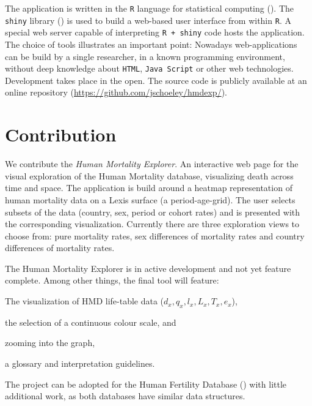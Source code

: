\documentclass[
  12pt
]{scrartcl}
\begin{document}
The application is written in the \texttt{R} language for statistical computing (\cite{RCT2014}). The \texttt{shiny} library (\cite{Chang2015}) is used to build a web-based user interface from within \texttt{R}. A special web server capable of interpreting \texttt{R + shiny} code hosts the application. The choice of tools illustrates an important point: Nowadays web-applications can be build by a single researcher, in a known programming environment, without deep knowledge about \texttt{HTML}, \texttt{Java Script} or other web technologies. Development takes place in the open. The source code is publicly available at an online repository (\url{https://github.com/jschoeley/hmdexp/}).

\section*{Contribution}

We contribute the \emph{Human Mortality Explorer}. An interactive web page for the visual exploration of the Human Mortality database, visualizing death across time and space. The application is build around a heatmap representation of human mortality data on a Lexis surface (a period-age-grid). The user selects subsets of the data (country, sex, period or cohort rates) and is presented with the corresponding visualization. Currently there are three exploration views to choose from: pure mortality rates, sex differences of mortality rates and country differences of mortality rates.

The Human Mortality Explorer is in active development and not yet feature complete. Among other things, the final tool will feature:

\begin{compactenum}
  \item The visualization of HMD life-table data ($d_x, q_x, l_x, L_x, T_x, e_x$),
  \item the selection of a continuous colour scale, and
  \item zooming into the graph,
  \item a glossary and interpretation guidelines.
\end{compactenum}

The project can be adopted for the Human Fertility Database (\cite{HFDT2015}) with little additional work, as both databases have similar data structures.
\end{document}
